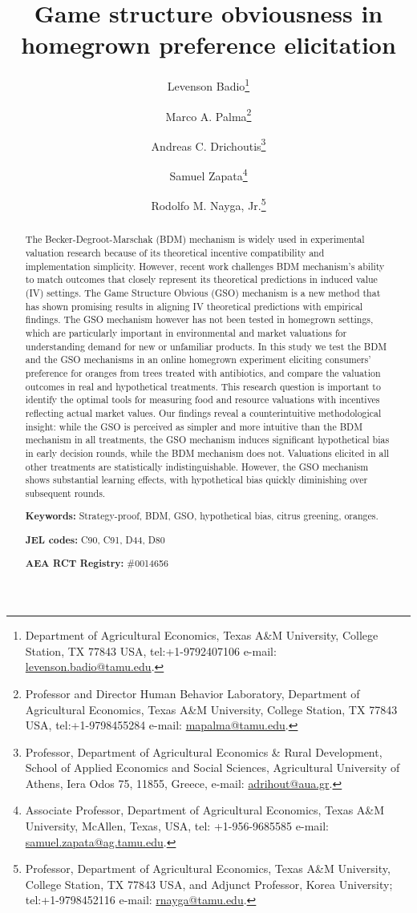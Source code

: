 \documentclass[12pt]{article}
\title{\textbf{Game structure obviousness in homegrown preference elicitation}}
\author[1]{Levenson Badio\thanks{Department of Agricultural Economics, Texas A\&M University, College Station, TX  77843 USA, tel:+1-9792407106 e-mail: \href{mailto:levenson.badio@tamu.edu}{levenson.badio@tamu.edu}.}}
\author[1]{Marco A. Palma\thanks{Professor and Director Human Behavior Laboratory, Department of Agricultural Economics, Texas A\&M University, College Station, TX  77843 USA, tel:+1-9798455284 e-mail: \href{mailto:mapalma@tamu.edu}{mapalma@tamu.edu}.}}
\author[2]{Andreas C. Drichoutis\thanks{Professor, Department of Agricultural Economics \& Rural Development, School of Applied Economics and Social Sciences, Agricultural University of Athens, Iera Odos 75, 11855, Greece, e-mail: \href{mailto:adrihout@aua.gr}{adrihout@aua.gr}.}}
\author[1]{Samuel Zapata\thanks{Associate Professor, Department of Agricultural Economics, Texas A\&M University, McAllen, Texas, USA, tel: +1-956-9685585 e-mail: \href{samuel.zapata@ag.tamu.edu}{samuel.zapata@ag.tamu.edu}.}}
\author[1]{Rodolfo M. Nayga, Jr.\thanks{Professor, Department of Agricultural Economics, Texas A\&M University, College Station, TX  77843 USA, and Adjunct Professor, Korea University; tel:+1-9798452116 e-mail: \href{mailto:rnayga@tamu.edu}{rnayga@tamu.edu}.}}
\affil[1]{Texas A\&M University}
\affil[2]{Agricultural University of Athens}
\date{}
\begin{document}
\maketitle
 \onehalfspacing

\begin{abstract}
\noindent The Becker-Degroot-Marschak (BDM) mechanism is widely used in experimental valuation research because of its theoretical incentive compatibility and implementation simplicity. However, recent work challenges BDM mechanism's ability to match outcomes that closely represent its theoretical predictions in induced value (IV) settings. The Game Structure Obvious (GSO) mechanism is a new method that has shown promising results in aligning IV theoretical predictions with empirical findings. The GSO mechanism however has not been tested in homegrown settings, which are particularly important in environmental and market valuations for understanding demand for new or unfamiliar products. In this study we test the BDM and the GSO mechanisms in an online homegrown experiment eliciting consumers' preference for oranges from trees treated with antibiotics, and compare the valuation outcomes in real and hypothetical treatments. This research question is important to identify the optimal tools for measuring food and resource valuations with incentives reflecting actual market values. Our findings reveal a counterintuitive methodological insight: while the GSO is perceived as simpler and more intuitive than the BDM mechanism in all treatments, the GSO mechanism induces significant hypothetical bias in early decision rounds, while the BDM mechanism does not. Valuations elicited in all other treatments are statistically indistinguishable. However, the GSO mechanism shows substantial learning effects, with hypothetical bias quickly diminishing over subsequent rounds. 

\textbf{Keywords:} Strategy-proof, BDM, GSO, hypothetical bias, citrus greening, oranges. 
	
\textbf{JEL codes:} C90, C91, D44, D80
 
 \textbf{AEA RCT Registry:} \#0014656
 
 \end{abstract}


\onehalfspacing
\end{document}
